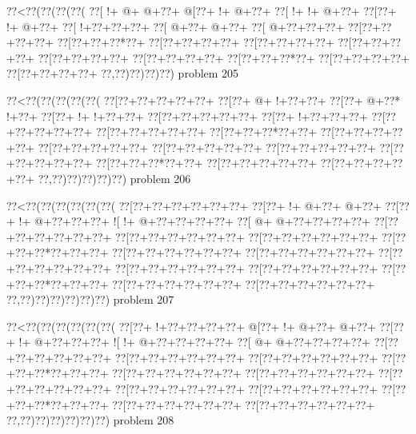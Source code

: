 \vbox{\vbox{\goo
\0??<\0??(\0??(\0??(\0??(
\0??[\- !+\- @+\- @+\0??+
\- @[\0??+\- !+\- @+\0??+
\0??[\- !+\- !+\- @+\0??+
\0??[\0??+\- !+\- @+\0??+
\0??[\- !+\0??+\0??+\0??+
\0??[\- @+\0??+\- @+\0??+
\0??[\- @+\0??+\0??+\0??+
\0??[\0??+\0??+\0??+\0??+
\0??[\0??+\0??+\0??*\0??+
\0??[\0??+\0??+\0??+\0??+
\0??[\0??+\0??+\0??+\0??+
\0??[\0??+\0??+\0??+\0??+
\0??[\0??+\0??+\0??+\0??+
\0??[\0??+\0??+\0??+\0??+
\0??[\0??+\0??+\0??*\0??+
\0??[\0??+\0??+\0??+\0??+
\0??[\0??+\0??+\0??+\0??+
\0??,\0??)\0??)\0??)\0??)
}
\hfil problem 205\hfil\break
}

\vbox{\vbox{\goo
\0??<\0??(\0??(\0??(\0??(\0??(
\0??[\0??+\0??+\0??+\0??+\0??+
\0??[\0??+\- @+\- !+\0??+\0??+
\0??[\0??+\- @+\0??*\- !+\0??+
\0??[\0??+\- !+\- !+\0??+\0??+
\0??[\0??+\0??+\0??+\0??+\0??+
\0??[\0??+\- !+\0??+\0??+\0??+
\0??[\0??+\0??+\0??+\0??+\0??+
\0??[\0??+\0??+\0??+\0??+\0??+
\0??[\0??+\0??+\0??*\0??+\0??+
\0??[\0??+\0??+\0??+\0??+\0??+
\0??[\0??+\0??+\0??+\0??+\0??+
\0??[\0??+\0??+\0??+\0??+\0??+
\0??[\0??+\0??+\0??+\0??+\0??+
\0??[\0??+\0??+\0??+\0??+\0??+
\0??[\0??+\0??+\0??*\0??+\0??+
\0??[\0??+\0??+\0??+\0??+\0??+
\0??[\0??+\0??+\0??+\0??+\0??+
\0??,\0??)\0??)\0??)\0??)\0??)
}
\hfil problem 206\hfil\break
}

\vbox{\vbox{\goo
\0??<\0??(\0??(\0??(\0??(\0??(\0??(
\0??[\0??+\0??+\0??+\0??+\0??+\0??+
\0??[\0??+\- !+\- @+\0??+\- @+\0??+
\0??[\0??+\- !+\- @+\0??+\0??+\0??+
\- ![\- !+\- @+\0??+\0??+\0??+\0??+
\0??[\- @+\- @+\0??+\0??+\0??+\0??+
\0??[\0??+\0??+\0??+\0??+\0??+\0??+
\0??[\0??+\0??+\0??+\0??+\0??+\0??+
\0??[\0??+\0??+\0??+\0??+\0??+\0??+
\0??[\0??+\0??+\0??*\0??+\0??+\0??+
\0??[\0??+\0??+\0??+\0??+\0??+\0??+
\0??[\0??+\0??+\0??+\0??+\0??+\0??+
\0??[\0??+\0??+\0??+\0??+\0??+\0??+
\0??[\0??+\0??+\0??+\0??+\0??+\0??+
\0??[\0??+\0??+\0??+\0??+\0??+\0??+
\0??[\0??+\0??+\0??*\0??+\0??+\0??+
\0??[\0??+\0??+\0??+\0??+\0??+\0??+
\0??[\0??+\0??+\0??+\0??+\0??+\0??+
\0??,\0??)\0??)\0??)\0??)\0??)\0??)
}
\hfil problem 207\hfil\break
}

\vbox{\vbox{\goo
\0??<\0??(\0??(\0??(\0??(\0??(\0??(
\0??[\0??+\- !+\0??+\0??+\0??+\0??+
\- @[\0??+\- !+\- @+\0??+\- @+\0??+
\0??[\0??+\- !+\- @+\0??+\0??+\0??+
\- ![\- !+\- @+\0??+\0??+\0??+\0??+
\0??[\- @+\- @+\0??+\0??+\0??+\0??+
\0??[\0??+\0??+\0??+\0??+\0??+\0??+
\0??[\0??+\0??+\0??+\0??+\0??+\0??+
\0??[\0??+\0??+\0??+\0??+\0??+\0??+
\0??[\0??+\0??+\0??*\0??+\0??+\0??+
\0??[\0??+\0??+\0??+\0??+\0??+\0??+
\0??[\0??+\0??+\0??+\0??+\0??+\0??+
\0??[\0??+\0??+\0??+\0??+\0??+\0??+
\0??[\0??+\0??+\0??+\0??+\0??+\0??+
\0??[\0??+\0??+\0??+\0??+\0??+\0??+
\0??[\0??+\0??+\0??*\0??+\0??+\0??+
\0??[\0??+\0??+\0??+\0??+\0??+\0??+
\0??[\0??+\0??+\0??+\0??+\0??+\0??+
\0??,\0??)\0??)\0??)\0??)\0??)\0??)
}
\hfil problem 208\hfil\break
}

